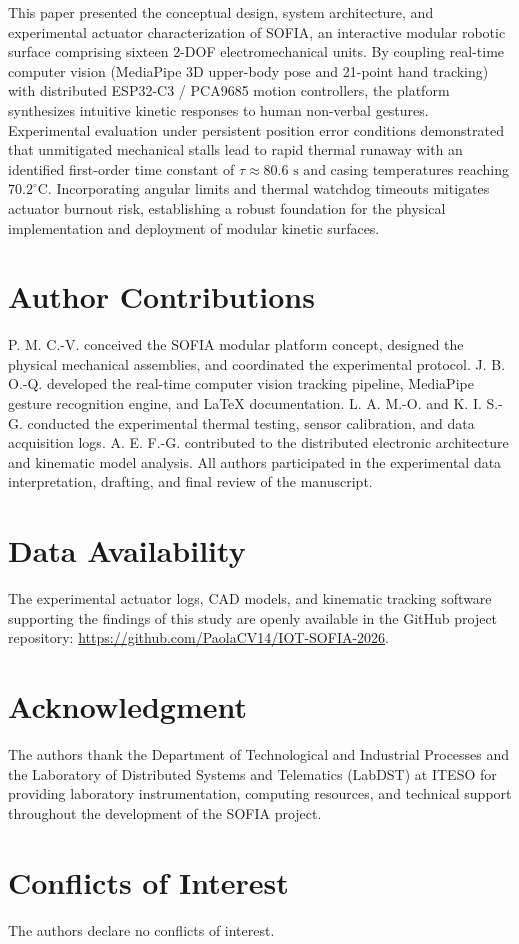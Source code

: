 \documentclass[lettersize,journal]{IEEEtran}
\begin{document}
This paper presented the conceptual design, system architecture, and experimental actuator characterization of SOFIA, an interactive modular robotic surface comprising sixteen 2-DOF electromechanical units. By coupling real-time computer vision (MediaPipe 3D upper-body pose and 21-point hand tracking) with distributed ESP32-C3 / PCA9685 motion controllers, the platform synthesizes intuitive kinetic responses to human non-verbal gestures. Experimental evaluation under persistent position error conditions demonstrated that unmitigated mechanical stalls lead to rapid thermal runaway with an identified first-order time constant of $\tau \approx 80.6\text{ s}$ and casing temperatures reaching $70.2^\circ\text{C}$. Incorporating angular limits and thermal watchdog timeouts mitigates actuator burnout risk, establishing a robust foundation for the physical implementation and deployment of modular kinetic surfaces.


\section*{Author Contributions}
P. M. C.-V. conceived the SOFIA modular platform concept, designed the physical mechanical assemblies, and coordinated the experimental protocol. J. B. O.-Q. developed the real-time computer vision tracking pipeline, MediaPipe gesture recognition engine, and LaTeX documentation. L. A. M.-O. and K. I. S.-G. conducted the experimental thermal testing, sensor calibration, and data acquisition logs. A. E. F.-G. contributed to the distributed electronic architecture and kinematic model analysis. All authors participated in the experimental data interpretation, drafting, and final review of the manuscript.

\section*{Data Availability}
The experimental actuator logs, CAD models, and kinematic tracking software supporting the findings of this study are openly available in the GitHub project repository: \url{https://github.com/PaolaCV14/IOT-SOFIA-2026}.

\section*{Acknowledgment}
The authors thank the Department of Technological and Industrial Processes and the Laboratory of Distributed Systems and Telematics (LabDST) at ITESO for providing laboratory instrumentation, computing resources, and technical support throughout the development of the SOFIA project.

\section*{Conflicts of Interest}
The authors declare no conflicts of interest.

\balance



\end{document}
